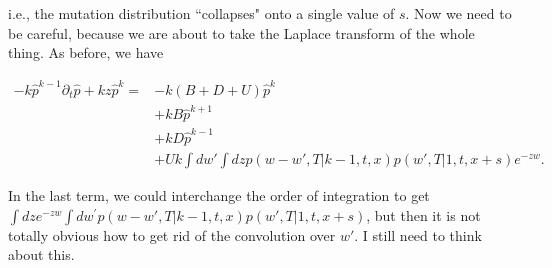 \documentclass[10pt]{revtex4}
\begin{document}
i.e., the mutation distribution ``collapses" onto a single value of $s$.
Now we need to be careful, because we are about to take the Laplace transform of the whole thing. As before, we have

\begin{align*}
-k\hat{p}^{k-1} \partial_t\hat{p} + kz\hat{p}^k = &-k(B+D+U) \hat{p}^k \\
& + kB\hat{p}^{k+1} \\
& +kD\hat{p}^{k-1} \\
&+Uk \int dw\prime \int dz p(w-w\prime , T|k-1, t, x) p(w\prime,T|1,t,x+s) e^{-zw}.
\end{align*}

In the last term, we could interchange the order of integration to get $\int dz e^{-zw} \int dw^\prime p(w-w\prime , T|k-1, t, x) p(w\prime,T|1,t,x+s)$, but then it is not totally obvious how to get rid of the convolution over $w\prime$. I still need to think about this.
\end{document}
